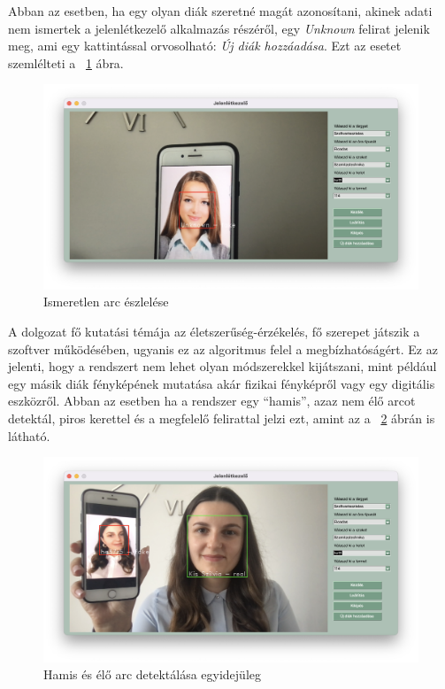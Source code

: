 Abban az esetben, ha egy olyan diák szeretné magát azonosítani, akinek adati nem ismertek a jelenlétkezelő alkalmazás részéről, egy \textit{Unknown} felirat jelenik meg, ami egy kattintással orvosolható: \textit{Új diák hozzáadása}. Ezt az esetet szemlélteti a ~\ref{fig:gy3} ábra.

\begin{figure}
	\includegraphics[width=\textwidth]{figures/gy3.png}
	\caption{Ismeretlen arc észlelése}
	\label{fig:gy3}
\end{figure}

A dolgozat fő kutatási témája az életszerűség-érzékelés, fő szerepet játszik a szoftver működésében, ugyanis ez az algoritmus felel a megbízhatóságért. Ez az jelenti, hogy a rendszert nem lehet olyan módszerekkel kijátszani, mint például egy másik diák fényképének mutatása akár fizikai fényképről vagy egy digitális eszközről. Abban az esetben ha a rendszer egy \enquote{hamis}, azaz nem élő arcot detektál, piros kerettel és a megfelelő felirattal jelzi ezt, amint az a ~\ref{fig:gy4} ábrán is látható.

\begin{figure}
	\includegraphics[width=\textwidth]{figures/gy4.png}
	\caption{Hamis és élő arc detektálása egyidejüleg}
	\label{fig:gy4}
\end{figure}

